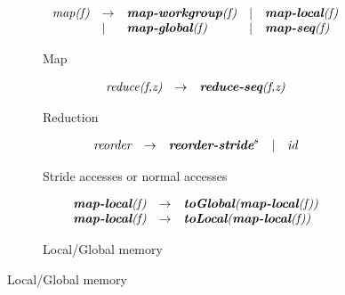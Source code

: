 \begin{figure}[t]
\begin{subfigure}[b]{1\linewidth}
\begin{mdframed}
$$%
\begin{array}{lllll}
\pat{map(f)} & \rightarrow & \pat{\textbf{map-workgroup}(f)} & | & \pat{\textbf{map-local}(f)}\\
 & | & \pat{\textbf{map-global}(f)} & | & \pat{\textbf{map-seq}(f)}\\          
\end{array}
$$
\end{mdframed}
  \caption{Map}
  \label{fig:low:map}
\end{subfigure}

\vspace{\ruleSpace}
\begin{subfigure}[b]{1\linewidth}
\begin{mdframed}
$$
\begin{array}{lll}
  \pat{reduce(f,z)} & \rightarrow & \pat{\textbf{reduce-seq}(f,z)}%
\end{array}
$$
\end{mdframed}
  \caption{Reduction}
  \label{fig:low:red}
\end{subfigure}

\vspace{\ruleSpace}
\begin{subfigure}[b]{1\linewidth}
\begin{mdframed}
$$
\begin{array}{lllll}
  \textit{reorder}  & \rightarrow & \textit{\textbf{reorder-stride}}^s & | & \textit{id}
\end{array}
$$
\end{mdframed}
  \caption{Stride accesses or normal accesses}
  \label{fig:low:stride}
\end{subfigure}

\vspace{\ruleSpace}
\begin{subfigure}[b]{1\linewidth}
\begin{mdframed}
$$
\begin{array}{lrl}
  \textit{\textbf{map-local}(f)} & \rightarrow & \textit{\textbf{toGlobal}(\textbf{map-local}(f))}\\  
  \textit{\textbf{map-local}(f)} & \rightarrow & \textit{\textbf{toLocal}(\textbf{map-local}(f))}\\  
\end{array}
$$
\end{mdframed}
  \caption{Local/Global memory}
  \label{fig:low:mem}
\end{subfigure}


\end{figure}
